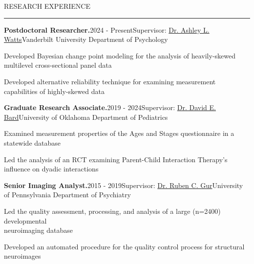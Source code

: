 \documentclass{resume} %
\renewenvironment{rSection}[1]{
	\sectionskip
	\textcolor{CarnegieMellonRed}{\MakeUppercase{#1}}
	\sectionlineskip
	\hrule
	\begin{list}{}{
			\setlength{\leftmargin}{1.5em}
		}
		\item[]
	}{
	\end{list}
}
\begin{document}
	\begin{rSection}{Research Experience}
		\begin{rSubsection}{\textbf{Postdoctoral Researcher.}}{2024 - Present}{Supervisor: \href{https://www.vanderbilt.edu/psychological_sciences/bio/ashley-watts}{Dr. Ashley L. Watts}}{Vanderbilt University Department of Psychology}
			\item Developed Bayesian change point modeling for the analysis of heavily-skewed multilevel cross-sectional panel data
			\item Developed alternative reliability technique for examining measurement capabilities of highly-skewed data
		\end{rSubsection}
		
		
		\begin{rSubsection}{\textbf{Graduate Research Associate.}}{2019 - 2024}{Supervisor: \href{https://research.ouhsc.edu/about/administration/details/david-bard-phd}{Dr. David E. Bard}}{University of Oklahoma Department of Pediatrics}
			\item Examined measurement properties of the Ages and Stages questionnaire in a statewide database
			\item Led the analysis of an RCT examining Parent-Child Interaction Therapy's influence on dyadic interactions  
		\end{rSubsection}
		
		\begin{rSubsection}{\textbf{Senior Imaging Analyst.}}{2015 - 2019}{Supervisor: \href{https://www.med.upenn.edu/bbl/faculty-rcgur.html}{Dr. Ruben C. Gur}}{University of Pennsylvania Department of Psychiatry}
			\item Led the quality assessment, processing, and analysis of a large (n=2400) developmental\\ neuroimaging database
			\item Developed an automated procedure for the quality control process for structural neuroimages 
		\end{rSubsection}
		
	\end{rSection}
	
\end{document}
